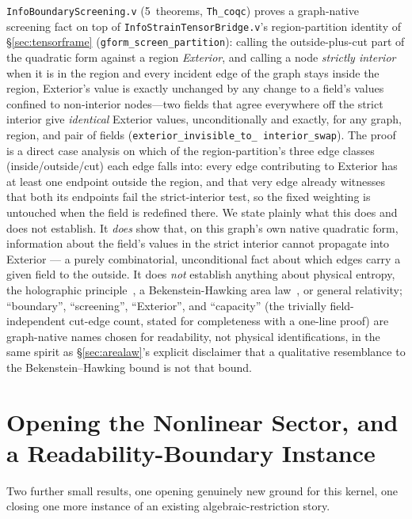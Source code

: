 \documentclass[10pt,twocolumn]{article}
\begin{document}
\texttt{InfoBoundaryScreening.v} (5~theorems, \texttt{Th\_coqc}) proves a
graph-native screening fact on top of \texttt{InfoStrainTensorBridge.v}'s
region-partition identity of \S\ref{sec:tensorframe}
(\texttt{gform\_screen\_partition}): calling the outside-plus-cut part of
the quadratic form against a region \emph{Exterior}, and calling a node
\emph{strictly interior} when it is in the region and every incident edge
of the graph stays inside the region, Exterior's value is exactly
unchanged by any change to a field's values confined to non-interior
nodes---two fields that agree everywhere off the strict interior give
\emph{identical} Exterior values, unconditionally and exactly, for any
graph, region, and pair of fields (\texttt{exterior\_invisible\_to\_
interior\_swap}). The proof is a direct case analysis on which of the
region-partition's three edge classes (inside/outside/cut) each edge falls
into: every edge contributing to Exterior has at least one endpoint outside
the region, and that very edge already witnesses that both its endpoints
fail the strict-interior test, so the fixed weighting is untouched when the
field is redefined there. We state plainly what this does and does not
establish. It \emph{does} show that, on this graph's own native quadratic
form, information about the field's values in the strict interior cannot
propagate into Exterior --- a purely combinatorial, unconditional fact
about which edges carry a given field to the outside. It does \emph{not}
establish anything about physical entropy, the holographic
principle~\cite{thooft1993,susskind1995}, a Bekenstein-Hawking area
law~\cite{bekenstein1973}, or general relativity; ``boundary'',
``screening'', ``Exterior'', and ``capacity'' (the trivially field-independent
cut-edge count, stated for completeness with a one-line proof) are
graph-native names chosen for readability, not physical identifications, in
the same spirit as \S\ref{sec:arealaw}'s explicit disclaimer that a
qualitative resemblance to the Bekenstein--Hawking bound is not that bound.

\section{Opening the Nonlinear Sector, and a Readability-Boundary Instance}
\label{sec:cubicreadability}
Two further small results, one opening genuinely new ground for this
kernel, one closing one more instance of an existing algebraic-restriction
story.
\end{document}
